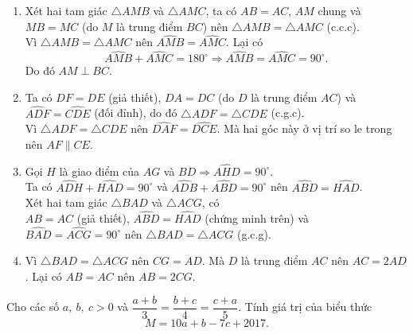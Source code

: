 \begin{ex}
{\begin{center}
	\end{center}
\begin{enumerate}
	\item Xét hai tam giác $ \triangle AMB$ và $\triangle AMC $, ta có $ AB=AC $, $ AM $ chung và $ MB=MC $ (do $ M $ là trung điểm $ BC $) nên $ \triangle AMB=\triangle AMC $ (c.c.c).\\
	Vì $ \triangle AMB=\triangle AMC $ nên $ \widehat{AMB}=\widehat{AMC} $. Lại có
	\[ 
	\widehat{AMB}+\widehat{AMC}=180^{\circ}\Rightarrow \widehat{AMB}=\widehat{AMC}=90^{\circ}.
	\]
	Do đó $ AM\perp BC $.
	\item Ta có $ DF=DE $ (giả thiết), $ DA=DC $ (do $ D $ là trung điểm $ AC $) và $ \widehat{ADF}=\widehat{CDE} $ (đối đỉnh), do đó $ \triangle ADF=\triangle CDE $ (c.g.c).\\
	Vì $ \triangle ADF=\triangle CDE $ nên $ \widehat{DAF}=\widehat{DCE} $. Mà hai góc này ở vị trí so le trong nên $ AF \parallel CE $.
	\item Gọi $ H $ là giao điểm của $ AG $ và $ BD\Rightarrow \widehat{AHD}=90^{\circ} $.\\
	Ta có $ \widehat{ADH}+\widehat{HAD}=90^{\circ} $ và $ \widehat{ADB}+\widehat{ABD}=90^{\circ} $ nên $ \widehat{ABD}=\widehat{HAD}$.\\
	Xét hai tam giác $ \triangle BAD$ và $\triangle ACG $, có\\
	$ AB=AC $ (giả thiết), $ \widehat{ABD}=\widehat{HAD} $ (chứng minh trên) và $ \widehat{BAD}=\widehat{ACG}=90^{\circ} $ nên $ \triangle BAD=\triangle ACG $ (g.c.g).
	\item Vì $ \triangle BAD=\triangle ACG $ nên $ CG=AD $. Mà $ D $ là trung điểm $ AC $ nên $ AC=2AD $. Lại có $ AB=AC $ nên $ AB=2CG $.
\end{enumerate}
} 
\end{ex}
\begin{ex}%
	Cho các số $ a,\ b,\ c>0 $ và $ \dfrac{a+b}{3}=\dfrac{b+c}{4}=\dfrac{c+a}{5} $. Tính giá trị của biểu thức
	\[ 
	M=10a+b-7c+2017.
	\]
\end{ex}
